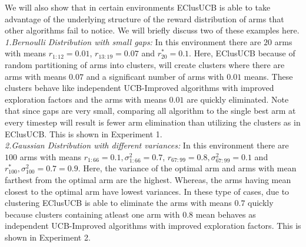We will also show that in certain environments EClusUCB is able to take advantage of the underlying structure of the reward distribution of arms that other algorithms fail to notice. We will briefly discuss two of these examples here.
\\
\textit{1.Bernoulli Distribution with small gaps:} In this environment there are $20$ arms with means $r_{1:12}=0.01$, $r_{13:19}=0.07$ and $r_{20}^{*} =0.1$. Here, EClusUCB because of random partitioning of arms into clusters, will create clusters where there are arms with means $0.07$ and a significant number of arms with $0.01$ means. These clusters behave like independent UCB-Improved algorithms with improved exploration factors and the arms with means $0.01$ are quickly eliminated. Note that since gaps are very small, comparing all algorithm to the single best arm at every timestep will result is fewer arm elimination than utilizing the clusters as in EClusUCB. This is shown in Experiment 1.\\
\textit{2.Gaussian Distribution with different variances:} In this environment there are $100$ arms with means $r_{1:66}=0.1,\sigma_{1:66}^2 =0.7$, $r_{67:99}=0.8,\sigma_{67:99}^2 =0.1$ and $r_{100}^{*}, \sigma_{100}^2 =0.7 =0.9$. Here, the variance of the optimal arm and arms with mean farthest from  the optimal arm are the highest. Whereas, the arms having mean closest to the optimal arm have lowest variances. In these type of cases, due to clustering EClusUCB is able to eliminate the arms with means $0.7$ quickly because clusters containing atleast one arm with $0.8$ mean behaves as independent UCB-Improved algorithms with improved exploration factors. This is shown in Experiment 2.

